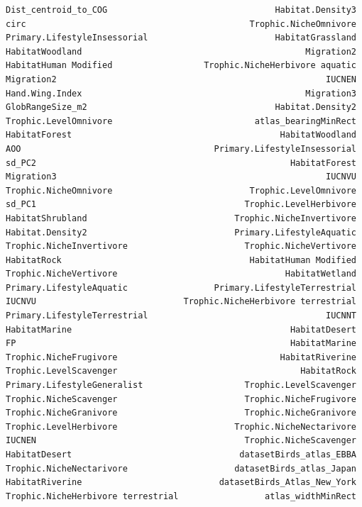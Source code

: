 \documentclass[
  letterpaper,
  DIV=11,
  numbers=noendperiod]{scrreprt}
\begin{document}
\begin{verbatim}
Dist_centroid_to_COG                                 Habitat.Density3
circ                                            Trophic.NicheOmnivore
Primary.LifestyleInsessorial                         HabitatGrassland
HabitatWoodland                                            Migration2
HabitatHuman Modified                  Trophic.NicheHerbivore aquatic
Migration2                                                     IUCNEN
Hand.Wing.Index                                            Migration3
GlobRangeSize_m2                                     Habitat.Density2
Trophic.LevelOmnivore                            atlas_bearingMinRect
HabitatForest                                         HabitatWoodland
AOO                                      Primary.LifestyleInsessorial
sd_PC2                                                  HabitatForest
Migration3                                                     IUCNVU
Trophic.NicheOmnivore                           Trophic.LevelOmnivore
sd_PC1                                         Trophic.LevelHerbivore
HabitatShrubland                             Trophic.NicheInvertivore
Habitat.Density2                             Primary.LifestyleAquatic
Trophic.NicheInvertivore                       Trophic.NicheVertivore
HabitatRock                                     HabitatHuman Modified
Trophic.NicheVertivore                                 HabitatWetland
Primary.LifestyleAquatic                 Primary.LifestyleTerrestrial
IUCNVU                             Trophic.NicheHerbivore terrestrial
Primary.LifestyleTerrestrial                                   IUCNNT
HabitatMarine                                           HabitatDesert
FP                                                      HabitatMarine
Trophic.NicheFrugivore                                HabitatRiverine
Trophic.LevelScavenger                                    HabitatRock
Primary.LifestyleGeneralist                    Trophic.LevelScavenger
Trophic.NicheScavenger                         Trophic.NicheFrugivore
Trophic.NicheGranivore                         Trophic.NicheGranivore
Trophic.LevelHerbivore                       Trophic.NicheNectarivore
IUCNEN                                         Trophic.NicheScavenger
HabitatDesert                                 datasetBirds_atlas_EBBA
Trophic.NicheNectarivore                     datasetBirds_atlas_Japan
HabitatRiverine                           datasetBirds_Atlas_New_York
Trophic.NicheHerbivore terrestrial                 atlas_widthMinRect
\end{verbatim}
\end{document}
